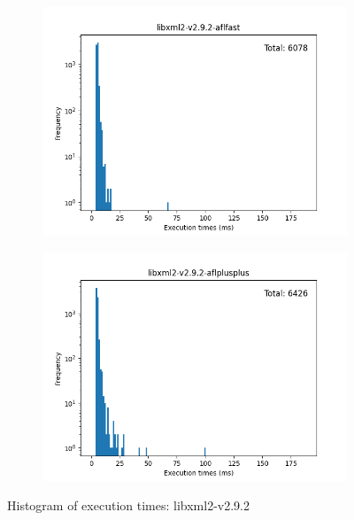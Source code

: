 \begin{figure}
\begin{subfigure}[t]{0.475\textwidth}
        \centering
        \includegraphics[width=\textwidth]{Experiments/execs/libxml2-v2.9.2-aflfast.png}
        \caption{}
        \label{fig:sub:libxml2-hist-aflfast}
    \end{subfigure}
    \hfill
    \begin{subfigure}[t]{0.475\textwidth}
        \centering
        \includegraphics[width=\textwidth]{Experiments/execs/libxml2-v2.9.2-aflplusplus.png}
        \caption{}
        \label{fig:sub:libxml2-hist-aflplusplus}
    \end{subfigure}

    \caption{Histogram of execution times: libxml2-v2.9.2}
    \label{Figure:exe-libxml}
\end{figure}

